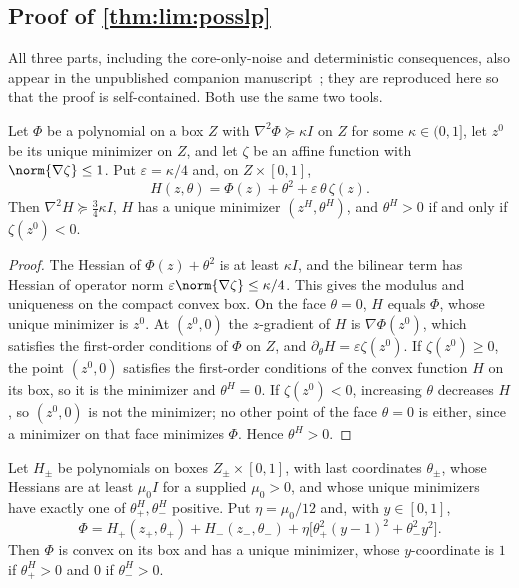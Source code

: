 \subsection{Proof of \texorpdfstring{\cref{thm:lim:posslp}}{the point-output theorem}}\label{app:lim:posslp}

All three parts, including the core-only-noise and deterministic
consequences, also appear in the unpublished companion
manuscript~\citep{companion-exact-arithmetic}; they are reproduced here so
that the proof is self-contained. Both use the same two tools.

\begin{lemma}\label{lem:lim:signs}
Let $\Phi$ be a polynomial on a box $Z$ with $\nabla^2\Phi\succeq\kappa I$ on
$Z$ for some $\kappa\in(0,1]$, let $z^0$ be its unique minimizer on $Z$, and
let $\zeta$ be an affine function with $\norm{\nabla\zeta}\le1$. Put
$\varepsilon=\kappa/4$ and, on $Z\times[0,1]$,
\[
 H(z,\theta)=\Phi(z)+\theta^2+\varepsilon\,\theta\,\zeta(z).
\]
Then $\nabla^2H\succeq\frac34\kappa I$, $H$ has a unique minimizer
$(z^H,\theta^H)$, and $\theta^H>0$ if and only if $\zeta(z^0)<0$.
\end{lemma}

\begin{proof}
The Hessian of $\Phi(z)+\theta^2$ is at least $\kappa I$, and the bilinear
term has Hessian of operator norm $\varepsilon\norm{\nabla\zeta}\le\kappa/4$.
This gives the modulus and uniqueness on the compact convex box. On the face
$\theta=0$, $H$ equals $\Phi$, whose unique minimizer is $z^0$. At
$(z^0,0)$ the $z$-gradient of $H$ is $\nabla\Phi(z^0)$, which satisfies the
first-order conditions of $\Phi$ on $Z$, and $\partial_\theta H=\varepsilon
\zeta(z^0)$. If $\zeta(z^0)\ge0$, the point $(z^0,0)$ satisfies the
first-order conditions of the convex function $H$ on its box, so it is the
minimizer and $\theta^H=0$. If $\zeta(z^0)<0$, increasing $\theta$ decreases
$H$, so $(z^0,0)$ is not the minimizer; no other point of the face
$\theta=0$ is either, since a minimizer on that face minimizes $\Phi$. Hence
$\theta^H>0$.
\end{proof}

\begin{lemma}\label{lem:lim:amplifier}
Let $H_\pm$ be polynomials on boxes $Z_\pm\times[0,1]$, with last coordinates
$\theta_\pm$, whose Hessians are at least $\mu_0I$ for a supplied
$\mu_0>0$, and whose unique
minimizers have exactly one of $\theta_+^H,\theta_-^H$ positive. Put
$\eta=\mu_0/12$ and, with $y\in[0,1]$,
\[
 \Phi=H_+(z_+,\theta_+)+H_-(z_-,\theta_-)
 +\eta\bigl[\theta_+^2(y-1)^2+\theta_-^2y^2\bigr].
\]
Then $\Phi$ is convex on its box and has a unique minimizer, whose
$y$-coordinate is $1$ if $\theta_+^H>0$ and $0$ if $\theta_-^H>0$.
\end{lemma}

